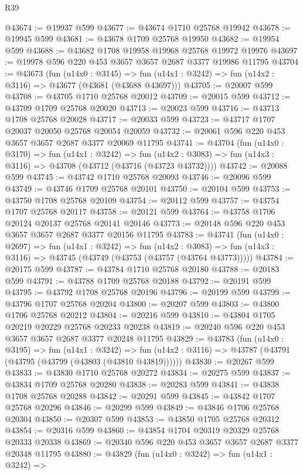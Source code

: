 \begin{lexlean}{R39}
\begin{coremodule}
@43674 := @19937 @599
@43677 := @43674 @1710 @25768 @19942
@43678 := @19945 @599
@43681 := @43678 @1709 @25768 @19950
@43682 := @19954 @599
@43688 := @43682 @1708 @19958 @19968 @25768 @19972 @19976
@43697 := @19978 @596 @220 @453 @3657 @3657 @2687 @3377 @19986 @11795
@43704 := @43673
    (fun (u14x0 : @3145) =>
    fun (u14x1 : @3242) => fun (u14x2 : @3116) => @43677 (@43681 (@43688 @43697)))
@43705 := @20007 @599
@43708 := @43705 @1710 @25768 @20012
@43709 := @20015 @599
@43712 := @43709 @1709 @25768 @20020
@43713 := @20023 @599
@43716 := @43713 @1708 @25768 @20028
@43717 := @20033 @599
@43723 := @43717 @1707 @20037 @20050 @25768 @20054 @20059
@43732 := @20061 @596 @220 @453 @3657 @3657 @2687 @3377 @20069 @11795
@43741 := @43704
    (fun (u14x0 : @3170) =>
    fun (u14x1 : @3242) =>
    fun (u14x2 : @3083) => fun (u14x3 : @3116) => @43708 (@43712 (@43716 (@43723 @43732))))
@43742 := @20088 @599
@43745 := @43742 @1710 @25768 @20093
@43746 := @20096 @599
@43749 := @43746 @1709 @25768 @20101
@43750 := @20104 @599
@43753 := @43750 @1708 @25768 @20109
@43754 := @20112 @599
@43757 := @43754 @1707 @25768 @20117
@43758 := @20121 @599
@43764 := @43758 @1706 @20124 @20137 @25768 @20141 @20146
@43773 := @20148 @596 @220 @453 @3657 @3657 @2687 @3377 @20156 @11795
@43783 := @43741
    (fun (u14x0 : @2697) =>
    fun (u14x1 : @3242) =>
    fun (u14x2 : @3083) => fun (u14x3 : @3116) => @43745 (@43749 (@43753 (@43757 (@43764 @43773)))))
@43784 := @20175 @599
@43787 := @43784 @1710 @25768 @20180
@43788 := @20183 @599
@43791 := @43788 @1709 @25768 @20188
@43792 := @20191 @599
@43795 := @43792 @1708 @25768 @20196
@43796 := @20199 @599
@43799 := @43796 @1707 @25768 @20204
@43800 := @20207 @599
@43803 := @43800 @1706 @25768 @20212
@43804 := @20216 @599
@43810 := @43804 @1705 @20219 @20229 @25768 @20233 @20238
@43819 := @20240 @596 @220 @453 @3657 @3657 @2687 @3377 @20248 @11795
@43829 := @43783
    (fun (u14x0 : @3195) =>
    fun (u14x1 : @3242) =>
    fun (u14x2 : @3116) => @43787 (@43791 (@43795 (@43799 (@43803 (@43810 @43819))))))
@43830 := @20267 @599
@43833 := @43830 @1710 @25768 @20272
@43834 := @20275 @599
@43837 := @43834 @1709 @25768 @20280
@43838 := @20283 @599
@43841 := @43838 @1708 @25768 @20288
@43842 := @20291 @599
@43845 := @43842 @1707 @25768 @20296
@43846 := @20299 @599
@43849 := @43846 @1706 @25768 @20304
@43850 := @20307 @599
@43853 := @43850 @1705 @25768 @20312
@43854 := @20316 @599
@43860 := @43854 @1704 @20319 @20329 @25768 @20333 @20338
@43869 := @20340 @596 @220 @453 @3657 @3657 @2687 @3377 @20348 @11795
@43880 := @43829
    (fun (u14x0 : @3242) =>
    fun (u14x1 : @3242) =>

\end{coremodule}
\end{lexlean}
